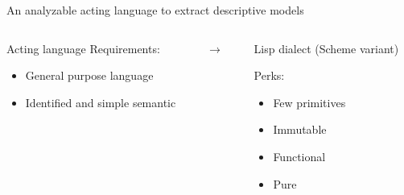 \begin{frame}[c]{An analyzable acting language to extract descriptive models}
    \begin{columns}[c]
        \begin{column}{0.45\textwidth}
            Acting language Requirements:
            \begin{itemize}
                \item General purpose language
                \item Identified and simple semantic
            \end{itemize}
        \end{column}
        \begin{column}[c]{0.1\textwidth}
            \centering
            $\rightarrow$
        \end{column}
        \begin{column}{0.5\textwidth}
            \pause
            Lisp dialect (Scheme variant) \cite{moretti1979lambda}

            Perks:
            \begin{itemize}
                \item Few primitives
                \item Immutable
                \item Functional
                \item Pure
            \end{itemize}
        \end{column}
    \end{columns}
\end{frame}

